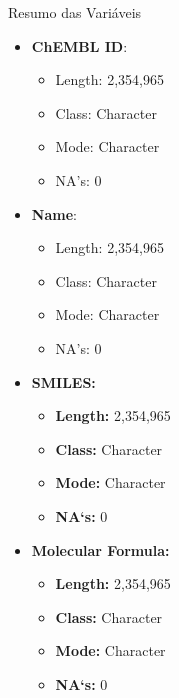 \documentclass[8pt]{beamer}
\begin{document}
\begin{frame}{Resumo das Variáveis}
\begin{multicols}{2}
  \begin{itemize}
    \item \textbf{ChEMBL ID}:
      \begin{itemize}
        \item Length: 2,354,965
        \item Class: Character
        \item Mode: Character
        \item NA's: 0
      \end{itemize}
    \item \textbf{Name}:
      \begin{itemize}
        \item Length: 2,354,965
        \item Class: Character
        \item Mode: Character
        \item NA's: 0
      \end{itemize}
      \item \textbf{SMILES:}
    \begin{itemize}
        \item \textbf{Length:} 2,354,965
        \item \textbf{Class:} Character
        \item \textbf{Mode:} Character
        \item \textbf{NA`s:} 0
    \end{itemize}
     \item \textbf{Molecular Formula:}
    \begin{itemize}
        \item \textbf{Length:} 2,354,965
        \item \textbf{Class:} Character
        \item \textbf{Mode:} Character
        \item \textbf{NA`s:} 0
    \end{itemize}
  \end{itemize}
  \end{multicols}
\end{frame}
\end{document}

